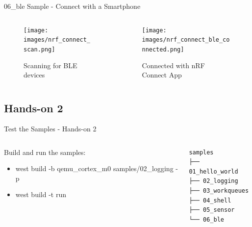 \documentclass[10pt, aspectratio=169]{beamer}
\begin{document}
\begin{frame}[fragile]{06\_ble Sample - Connect with a Smartphone}
  \begin{columns}
    \begin{column}{0.5\textwidth}
      \begin{figure}
        \texttt{[image: images/nrf\_connect\_scan.png]}
        \caption*{Scanning for BLE devices}
      \end{figure}
    \end{column}
    \begin{column}{0.5\textwidth}
      \begin{figure}
        \texttt{[image: images/nrf\_connect\_ble\_connected.png]}
        \caption*{Connected with nRF Connect App}
      \end{figure}
    \end{column}
  \end{columns}
\end{frame}
\subsection{Hands-on 2}
\begin{frame}[fragile]{Test the Samples - Hands-on 2}
  \begin{columns}
    \begin{column}{0.6\textwidth}
      Build and run the samples\footnotemark:
      \begin{itemize}
        \item \scriptsize west build -b qemu\_cortex\_m0 samples/02\_logging -p
        \item \scriptsize west build -t run
      \end{itemize}
    \end{column}
    \begin{column}{0.4\textwidth}
        {\fontsize{7}{7}\selectfont
          \begin{verbatim}
samples
├── 01_hello_world
├── 02_logging
├── 03_workqueues
├── 04_shell
├── 05_sensor
└── 06_ble
        \end{verbatim}
      }
    \end{column}
  \end{columns}
\end{frame}
\end{document}
